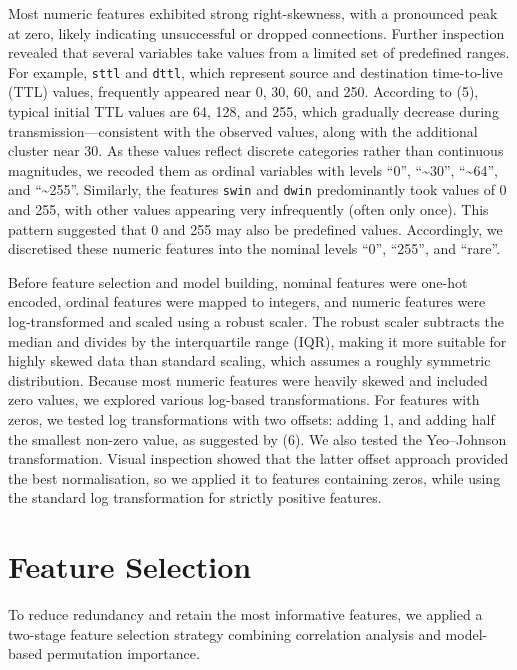 \documentclass[
  a4paper,
]{scrreprt}
\begin{document}
Most numeric features exhibited strong right-skewness, with a pronounced
peak at zero, likely indicating unsuccessful or dropped connections.
Further inspection revealed that several variables take values from a
limited set of predefined ranges. For example, \texttt{sttl} and
\texttt{dttl}, which represent source and destination time-to-live (TTL)
values, frequently appeared near 0, 30, 60, and 250. According to (5),
typical initial TTL values are 64, 128, and 255, which gradually
decrease during transmission---consistent with the observed values,
along with the additional cluster near 30. As these values reflect
discrete categories rather than continuous magnitudes, we recoded them
as ordinal variables with levels ``0'', ``\textasciitilde30'',
``\textasciitilde64'', and ``\textasciitilde255''. Similarly, the
features \texttt{swin} and \texttt{dwin} predominantly took values of 0
and 255, with other values appearing very infrequently (often only
once). This pattern suggested that 0 and 255 may also be predefined
values. Accordingly, we discretised these numeric features into the
nominal levels ``0'', ``255'', and ``rare''.

Before feature selection and model building, nominal features were
one-hot encoded, ordinal features were mapped to integers, and numeric
features were log-transformed and scaled using a robust scaler. The
robust scaler subtracts the median and divides by the interquartile
range (IQR), making it more suitable for highly skewed data than
standard scaling, which assumes a roughly symmetric distribution.
Because most numeric features were heavily skewed and included zero
values, we explored various log-based transformations. For features with
zeros, we tested log transformations with two offsets: adding 1, and
adding half the smallest non-zero value, as suggested by (6). We also
tested the Yeo--Johnson transformation. Visual inspection showed that
the latter offset approach provided the best normalisation, so we
applied it to features containing zeros, while using the standard log
transformation for strictly positive features.

\section{Feature Selection}\label{feature-selection}

To reduce redundancy and retain the most informative features, we
applied a two-stage feature selection strategy combining correlation
analysis and model-based permutation importance.
\end{document}
